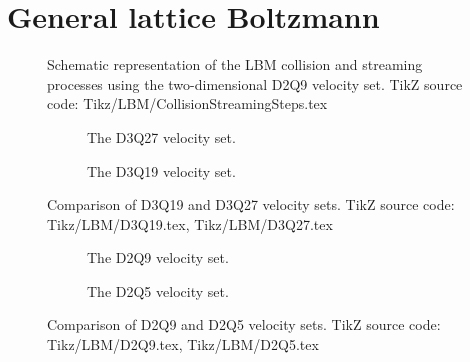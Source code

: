 \section{General lattice Boltzmann}
%
\begin{figure}[hbt]
    \centering
    
\end{figure}
%
\begin{figure}[hbt]
    \centering
    
    \caption{Schematic representation of the LBM collision and streaming processes using the two-dimensional D2Q9 velocity set. TikZ source code: Tikz/LBM/CollisionStreamingSteps.tex}
    \label{fig:CollisionStreamingSteps}
\end{figure}
%
%
\begin{figure}[hbt]
    \centering
    \begin{subfigure}{0.48\textwidth}
        \centering
        
        \caption{The D3Q27 velocity set.}
        \label{fig:D3Q27}
    \end{subfigure}
    \hfill
    \begin{subfigure}{0.48\textwidth}
        \centering
        
        \caption{The D3Q19 velocity set.}
        \label{fig:D3Q19}
    \end{subfigure}
    \caption{Comparison of D3Q19 and D3Q27 velocity sets. TikZ source code: Tikz/LBM/D3Q19.tex, Tikz/LBM/D3Q27.tex}
    \label{fig:VelocitySetComparison}
\end{figure}
%
%
\begin{figure}[hbt]
    \centering
    \begin{subfigure}{0.48\textwidth}
        \centering
        
        \caption{The D2Q9 velocity set.}
        \label{fig:D2Q9}
    \end{subfigure}
    \hfill
    \begin{subfigure}{0.48\textwidth}
        \centering
        
        \caption{The D2Q5 velocity set.}
        \label{fig:D2Q5}
    \end{subfigure}
    \caption{Comparison of D2Q9 and D2Q5 velocity sets. TikZ source code: Tikz/LBM/D2Q9.tex, Tikz/LBM/D2Q5.tex}
    \label{fig:VelocitySetComparison2D}
\end{figure}
%
%
